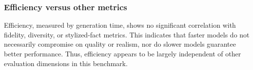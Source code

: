     \subsubsection{Efficiency versus other metrics}
      Efficiency, measured by generation time, shows no significant
      correlation with fidelity, diversity, or stylized-fact metrics.
      This indicates that faster models do not necessarily compromise
      on quality or realism, nor do slower models guarantee better
      performance. Thus, efficiency appears to be largely independent
      of other evaluation dimensions in this benchmark.

